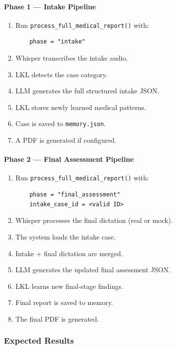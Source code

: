 \paragraph{Phase 1 --- Intake Pipeline}
\begin{enumerate}
    \item Run \texttt{process\_full\_medical\_report()} with:
    \begin{verbatim}
    phase = "intake"
    \end{verbatim}
    \item Whisper transcribes the intake audio.
    \item LKL detects the case category.
    \item LLM generates the full structured intake JSON.
    \item LKL stores newly learned medical patterns.
    \item Case is saved to \texttt{memory.json}.
    \item A PDF is generated if configured.
\end{enumerate}

\paragraph{Phase 2 --- Final Assessment Pipeline}
\begin{enumerate}
    \item Run \texttt{process\_full\_medical\_report()} with:
    \begin{verbatim}
    phase = "final_assessment"
    intake_case_id = <valid ID>
    \end{verbatim}
    \item Whisper processes the final dictation (real or mock).
    \item The system loads the intake case.
    \item Intake + final dictation are merged.
    \item LLM generates the updated final assessment JSON.
    \item LKL learns new final-stage findings.
    \item Final report is saved to memory.
    \item The final PDF is generated.
\end{enumerate}

\subsubsection*{Expected Results}

